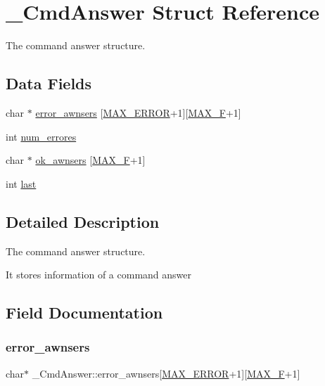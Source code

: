 \hypertarget{struct__CmdAnswer}{}\section{\+\_\+\+Cmd\+Answer Struct Reference}
\label{struct__CmdAnswer}


The command answer structure.  


\subsection*{Data Fields}
\begin{DoxyCompactItemize}
\item 
char $\ast$ \hyperlink{struct__CmdAnswer_a5f10084cf3815b23b5747eae04d37c74}{error\+\_\+awnsers} \mbox{[}\hyperlink{cmdAnswer_8h_a7c213cc89d01ec9cdbaa3356698a86ce}{M\+A\+X\+\_\+\+E\+R\+R\+OR}+1\mbox{]}\mbox{[}\hyperlink{cmdAnswer_8h_a4cbdbe9b7f8e2757f49434127d9f1cb3}{M\+A\+X\+\_\+F}+1\mbox{]}
\item 
int \hyperlink{struct__CmdAnswer_a5d8d0bc22a3af9deea5c77b3b8d95a9c}{num\+\_\+errores}
\item 
char $\ast$ \hyperlink{struct__CmdAnswer_ae721fdb2efdf0882e2fdacf74451c77b}{ok\+\_\+awnsers} \mbox{[}\hyperlink{cmdAnswer_8h_a4cbdbe9b7f8e2757f49434127d9f1cb3}{M\+A\+X\+\_\+F}+1\mbox{]}
\item 
int \hyperlink{struct__CmdAnswer_a1e4af9c26d5974297fe891f6c5400f0d}{last}
\end{DoxyCompactItemize}


\subsection{Detailed Description}
The command answer structure. 

It stores information of a command answer 

\subsection{Field Documentation}
\mbox{\label{struct__CmdAnswer_a5f10084cf3815b23b5747eae04d37c74}} 
\subsubsection{\texorpdfstring{error\+\_\+awnsers}{error\_awnsers}}
{\footnotesize\ttfamily char$\ast$ \+\_\+\+Cmd\+Answer\+::error\+\_\+awnsers\mbox{[}\hyperlink{cmdAnswer_8h_a7c213cc89d01ec9cdbaa3356698a86ce}{M\+A\+X\+\_\+\+E\+R\+R\+OR}+1\mbox{]}\mbox{[}\hyperlink{cmdAnswer_8h_a4cbdbe9b7f8e2757f49434127d9f1cb3}{M\+A\+X\+\_\+F}+1\mbox{]}}

